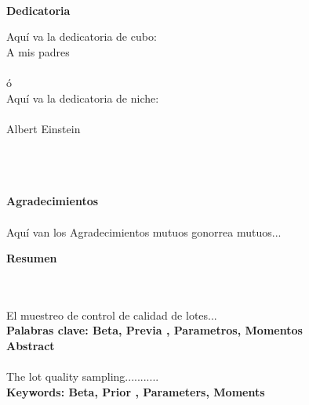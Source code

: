\newpage

\thispagestyle{empty} \textbf{}\normalsize
\\\\\\
\textbf{Dedicatoria}\\[4.0cm]

\begin{flushright}
\begin{minipage}{8cm}
\noindent
\small
Aqu\'{i} va la dedicatoria de cubo:\\[1.0cm]
A mis padres\\[1.0cm]\\
\'{o}\\[1.0cm]
Aqu\'{i} va la dedicatoria de niche:\\\\
Albert Einstein\\
\end{minipage}
\end{flushright}

\newpage{\pagestyle{empty}\cleardoublepage}

\newpage

\thispagestyle{empty} \textbf{}\normalsize
\\\\\\
\textbf{\LARGE Agradecimientos}\\\\

Aqu\'{i} van los Agradecimientos mutuos gonorrea mutuos...

\newpage{\pagestyle{empty}\cleardoublepage}

\newpage

\textbf{\LARGE Resumen}
\\\\
El muestreo de control de calidad de lotes...\\[0.5cm]

\textbf{\small Palabras clave: Beta, Previa , Parametros, Momentos}\\[1cm]

\textbf{\LARGE Abstract}\\\\
The lot quality sampling...........\\[0.5cm]

\textbf{\small Keywords: Beta, Prior , Parameters, Moments}\\

\newpage{\pagestyle{empty}\cleardoublepage}